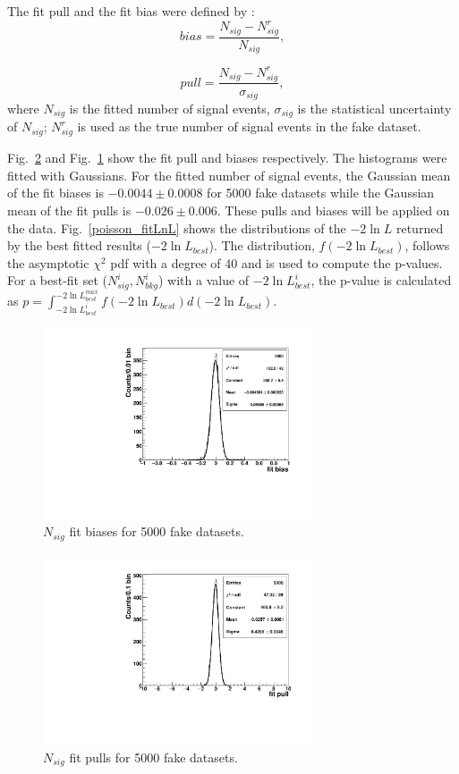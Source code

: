 The fit pull and the fit bias were defined by \cite{leta}:
\begin{equation}
bias=\frac{N_{sig}-N^r_{sig}}{N_{sig}},
\end{equation}

\begin{equation}
pull=\frac{N_{sig}-N^r_{sig}}{\sigma_{sig}},
\end{equation}
where $N_{sig}$ is the fitted number of signal events, $\sigma_{sig}$ is the statistical uncertainty of $N_{sig}$; $N^{r}_{sig}$ is used as the true number of signal events in the fake dataset.

Fig.~\ref{poisson_fitPull} and Fig.~\ref{poisson_fitBias} show the fit pull and biases respectively. The histograms were fitted with Gaussians. For the fitted number of signal events, the Gaussian mean of the fit biases is $-0.0044\pm0.0008$ for 5000 fake datasets while the Gaussian mean of the fit pulls is $-0.026\pm0.006$. These pulls and biases will be applied on the data. Fig.~\ref{poisson_fitLnL} shows the distributions of the $-2\ln L$ returned by the best fitted results ($-2\ln L_{best}$). The distribution, $f({-2\ln L_{best}})$, follows the asymptotic $\chi^2$ pdf with a degree of 40 and is used to compute the p-values\cite{pdg2020}. For a best-fit set ($N^i_{sig},N^i_{bkg}$) with a value of $-2\ln L^i_{best}$, the p-value is calculated as $p=\int_{-2\ln L^{i}_{best}}^{-2\ln L^{max}_{best}}f({-2\ln L_{best}})d(-2\ln L_{best})$.

\begin{figure}[!htb]
	\centering
	\includegraphics[width=8cm]{ensemble_fitBias.pdf}
	\caption{$N_{sig}$ fit biases for 5000 fake datasets.}
	\label{poisson_fitBias}
\end{figure} 

\begin{figure}[!htb]
	\centering
	\includegraphics[width=8cm]{ensemble_fitPull.pdf}
	\caption{$N_{sig}$ fit pulls for 5000 fake datasets.}
	\label{poisson_fitPull}
\end{figure} 

